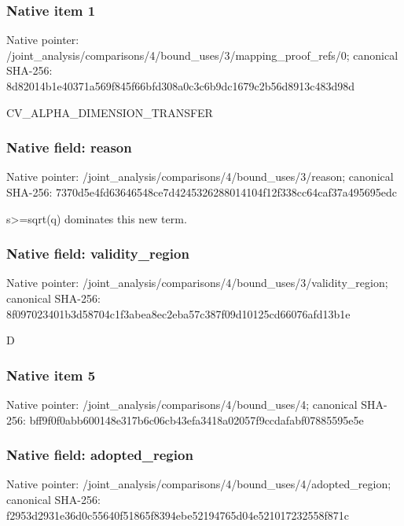 \documentclass[10pt,a4paper]{article}
\begin{document}
\subsubsection{Native item 1}


Native pointer: /joint\_analysis/comparis\allowbreak{}ons/4/bound\_uses/3/mappi\allowbreak{}ng\_proof\_refs/0; canonical SHA-256: 8d82014b1e40371a569f845f\allowbreak{}66bfd308a0c3c6b9dc1679c2\allowbreak{}b56d8913c483d98d


CV\_ALPHA\_DIMENSION\_TRANSFER


\subsubsection{Native field: reason}


Native pointer: /joint\_analysis/comparis\allowbreak{}ons/4/bound\_uses/3/reaso\allowbreak{}n; canonical SHA-256: 7370d5e4fd63646548ce7d42\allowbreak{}45326288014104f12f338cc6\allowbreak{}4caf37a495695edc


s>=sqrt(q) dominates this new term.


\subsubsection{Native field: validity\_region}


Native pointer: /joint\_analysis/comparis\allowbreak{}ons/4/bound\_uses/3/valid\allowbreak{}ity\_region; canonical SHA-256: 8f097023401b3d58704c1f3a\allowbreak{}bea8ec2eba57c387f09d1012\allowbreak{}5cd66076afd13b1e


D


\subsubsection{Native item 5}


Native pointer: /joint\_analysis/comparis\allowbreak{}ons/4/bound\_uses/4; canonical SHA-256: bff9f0f0abb600148e317b6c\allowbreak{}06cb43efa3418a02057f9ccd\allowbreak{}afabf07885595e5e



\subsubsection{Native field: adopted\_region}


Native pointer: /joint\_analysis/comparis\allowbreak{}ons/4/bound\_uses/4/adopt\allowbreak{}ed\_region; canonical SHA-256: f2953d2931e36d0c55640f51\allowbreak{}865f8394ebe52194765d04e5\allowbreak{}21017232558f871c
\end{document}
